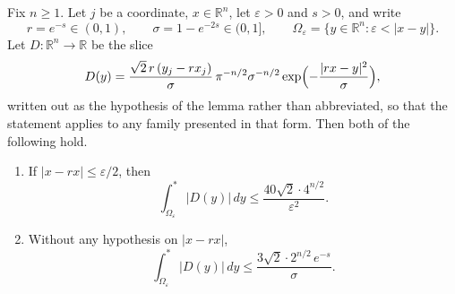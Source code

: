 \begin{lemma}
Fix $n \geq 1$.  Let $j$ be a coordinate, $x \in \mathbb{R}^n$, let
$\varepsilon > 0$ and $s > 0$, and write
\[
  r = e^{-s} \in (0,1) , \qquad \sigma = 1 - e^{-2s} \in (0,1] ,
  \qquad \Omega_\varepsilon = \{y \in \mathbb{R}^n : \varepsilon < |x-y|\} .
\]
Let $D : \mathbb{R}^n \to \mathbb{R}$ be the slice
\[
  D(y) = \frac{\sqrt2\,r\,(y_j - r x_j)}{\sigma}\,
    \pi^{-n/2}\sigma^{-n/2}
    \exp\Bigl(-\frac{|r x - y|^2}{\sigma}\Bigr) ,
\]
written out as the hypothesis of the lemma rather than abbreviated, so that the
statement applies to any family presented in that form.  Then both of the
following hold.
\begin{enumerate}
  \item If $|x - rx| \leq \varepsilon/2$, then
    \[
      \int^*_{\Omega_\varepsilon}\bigl|D(y)\bigr|\,dy
        \leq \frac{40\sqrt2\cdot4^{n/2}}{\varepsilon^2} .
    \]
  \item Without any hypothesis on $|x-rx|$,
    \[
      \int^*_{\Omega_\varepsilon}\bigl|D(y)\bigr|\,dy
        \leq \frac{3\sqrt2\cdot2^{n/2}\,e^{-s}}{\sigma} .
    \]
\end{enumerate}
\end{lemma}
